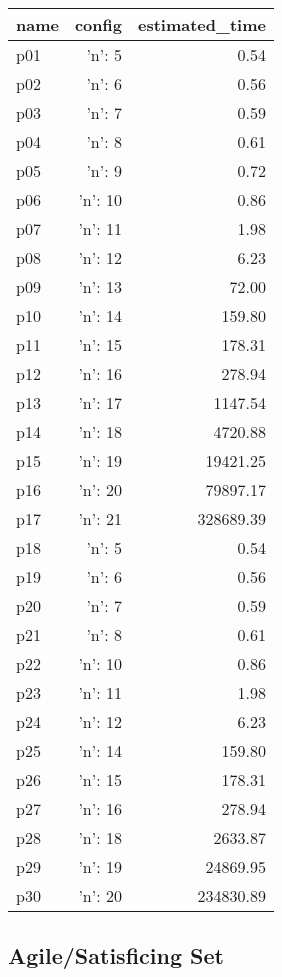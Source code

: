 \documentclass{article}
\begin{document}
                            \begin{center}
                            \scriptsize
                            \begin{tabular}{@{}l|r|r@{}}
                            name & config & estimated\_time\\\midrule
                              p01&{'n': 5}&0.54\\
  p02&{'n': 6}&0.56\\
  p03&{'n': 7}&0.59\\
  p04&{'n': 8}&0.61\\
  p05&{'n': 9}&0.72\\
  p06&{'n': 10}&0.86\\
  p07&{'n': 11}&1.98\\
  p08&{'n': 12}&6.23\\
  p09&{'n': 13}&72.00\\
  p10&{'n': 14}&159.80\\
  p11&{'n': 15}&178.31\\
  p12&{'n': 16}&278.94\\
  p13&{'n': 17}&1147.54\\
  p14&{'n': 18}&4720.88\\
  p15&{'n': 19}&19421.25\\
  p16&{'n': 20}&79897.17\\
  p17&{'n': 21}&328689.39\\
  p18&{'n': 5}&0.54\\
  p19&{'n': 6}&0.56\\
  p20&{'n': 7}&0.59\\
  p21&{'n': 8}&0.61\\
  p22&{'n': 10}&0.86\\
  p23&{'n': 11}&1.98\\
  p24&{'n': 12}&6.23\\
  p25&{'n': 14}&159.80\\
  p26&{'n': 15}&178.31\\
  p27&{'n': 16}&278.94\\
  p28&{'n': 18}&2633.87\\
  p29&{'n': 19}&24869.95\\
  p30&{'n': 20}&234830.89
                            \end{tabular}
                            \end{center}
                    

                                \subsection*{Agile/Satisficing Set}
                                
\end{document}
